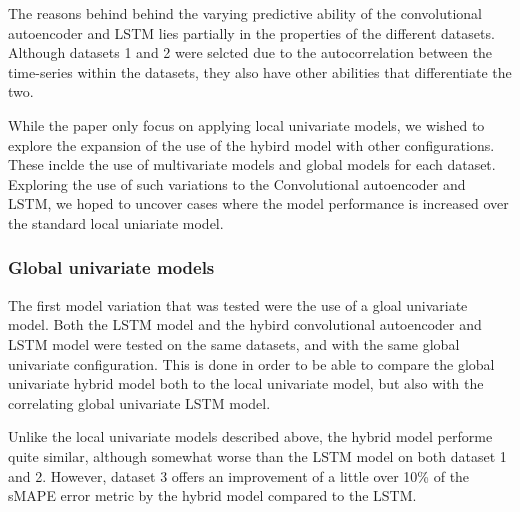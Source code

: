 The reasons behind behind the varying predictive ability of the convolutional autoencoder and LSTM lies partially
in the properties of the different datasets.
Although datasets 1 and 2 were selcted due to the autocorrelation between the time-series within the datasets,
they also have other abilities that differentiate the two.

  



While the paper \cite{Zhao2019} only focus on applying local univariate models,
we wished to explore the expansion of the use of the hybird model with other configurations.
These inclde the use of multivariate models and global models for each dataset.
Exploring the use of such variations to the Convolutional autoencoder and LSTM,
we hoped to uncover cases where the model performance is increased over the standard local uniariate model.



\subsubsection{Global univariate models}
The first model variation that was tested were the use of a gloal univariate model.
Both the LSTM model and the hybird convolutional autoencoder and LSTM model were tested on the same datasets,
and with the same global univariate configuration.
This is done in order to be able to compare the global univariate hybrid model both to the local univariate model,
but also with the correlating global univariate LSTM model.

Unlike the local univariate models described above, the hybrid model performe quite similar, although somewhat worse than the LSTM model
on both dataset 1 and 2.
However, dataset 3 offers an improvement of a little over 10\% of the sMAPE error metric by the hybrid model compared to the LSTM.

